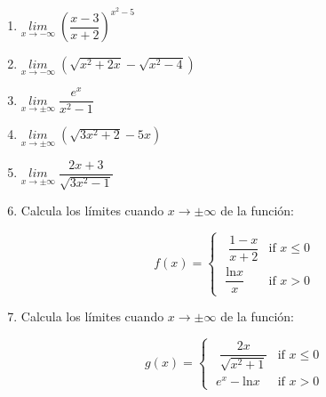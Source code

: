 \begin{multicols}{2}
\begin{enumerate}
		\rightline{\textcolor{gris}{Solución: $1$}}
		
		\item $\underset{x \to -\infty}{lim}\;{\left( \dfrac {x-3}{x+2} \right) ^{x^2-5}}$
		
		\rightline{\textcolor{gris}{Solución: $+\infty$}}
		
		\item $\underset{x \to -\infty}{lim}\;{\left(\sqrt{x^2+2x}-\sqrt{x^2-4} \right)}$
		
		\rightline{\textcolor{gris}{Solución: $-1$}}
		
		\item $\underset{x\to \pm\infty}{lim}\;{\dfrac {e^x}{x^2-1}}$
		
		\rightline{\textcolor{gris}{Solución: $\infty;\; 0$}}
		
		\item $\underset{x\to \pm \infty}{lim}\;{(\sqrt{3x^2+2}-5x)}$
		
		\rightline{\textcolor{gris}{Solución: $\mp\infty$}}
		
		\item $\underset{x\to \pm \infty}{lim}\;{\dfrac {2x+3}{\sqrt{3x^2-1}}}$
		
		
		\item Calcula los límites cuando $x \to \pm \infty$ de la función: 
		
		\begin{equation*}
		f(x)=
		\begin{cases} 
		\;\;  \dfrac{1-x}{x+2} &\mbox{if } x\le 0 \\ 
		\; \dfrac {\mathrm{ln} x}{x} & \mbox{if } x>0 
		\end{cases}
		\end{equation*}
		
		\rightline{\textcolor{gris}{Solución: $0,\; -1$}}
		
		\item Calcula los límites cuando $x \to \pm \infty$ de la función: 
		
		\begin{equation*}
		g(x)=
		\begin{cases} 
		\;\;  \dfrac{2x}{\sqrt{x^2+1}} &\mbox{if } x\le 0 \\ 
		\; e^x-\mathrm{ln}x & \mbox{if } x>0 
		\end{cases}
		\end{equation*}
		

\end{enumerate}
\end{multicols}
